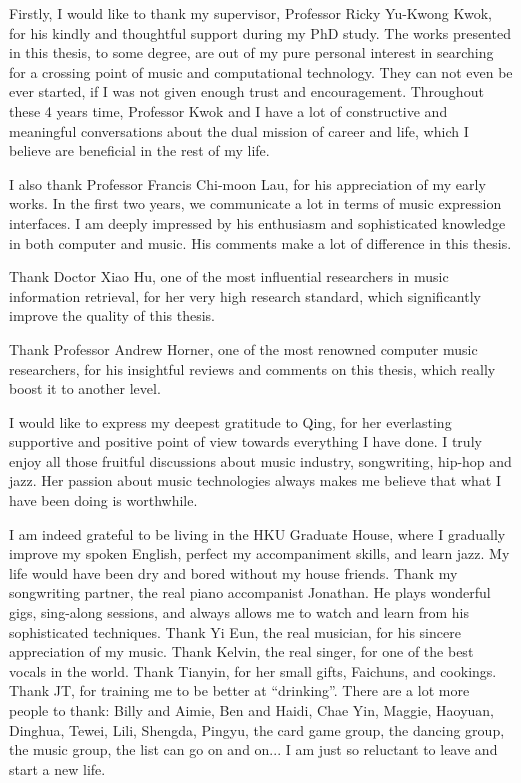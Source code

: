\begin{acknowledgements}

Firstly, I would like to thank my supervisor, Professor Ricky Yu-Kwong Kwok, for his kindly and thoughtful support during my PhD study. The works presented in this thesis, to some degree, are out of my pure personal interest in searching for a crossing point of music and computational technology. They can not even be ever started, if I was not given enough trust and encouragement. Throughout these 4 years time, Professor Kwok and I have a lot of constructive and meaningful conversations about the dual mission of career and life, which I believe are beneficial in the rest of my life.

I also thank Professor Francis Chi-moon Lau, for his appreciation of my early works. In the first two years, we communicate a lot in terms of music expression interfaces. I am deeply impressed by his enthusiasm and sophisticated knowledge in both computer and music. His comments make a lot of difference in this thesis.

Thank Doctor Xiao Hu, one of the most influential researchers in music information retrieval, for her very high research standard, which significantly improve the quality of this thesis.

Thank Professor Andrew Horner, one of the most renowned computer music researchers, for his insightful reviews and comments on this thesis, which really boost it to another level.

I would like to express my deepest gratitude to Qing, for her everlasting supportive and positive point of view towards everything I have done. I truly enjoy all those fruitful discussions about music industry, songwriting, hip-hop and jazz. Her passion about music technologies always makes me believe that what I have been doing is worthwhile.

I am indeed grateful to be living in the HKU Graduate House, where I gradually improve my spoken English, perfect my accompaniment skills, and learn jazz. My life would have been dry and bored without my house friends. Thank my songwriting partner, the real piano accompanist Jonathan. He plays wonderful gigs, sing-along sessions, and always allows me to watch and learn from his sophisticated techniques. Thank Yi Eun, the real musician, for his sincere appreciation of my music. Thank Kelvin, the real singer, for one of the best vocals in the world. Thank Tianyin, for her small gifts, Faichuns, and cookings. Thank JT, for training me to be better at ``drinking''. There are a lot more people to thank: Billy and Aimie, Ben and Haidi, Chae Yin, Maggie, Haoyuan, Dinghua, Tewei, Lili, Shengda, Pingyu, the card game group, the dancing group, the music group, the list can go on and on... I am just so reluctant to leave and start a new life.


\end{acknowledgements}
